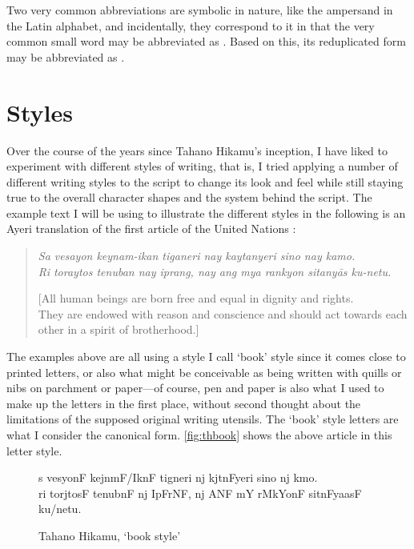 Two very common abbreviations are symbolic in nature, like the ampersand 
\orth{\&} in the Latin alphabet, and incidentally, they correspond to it in 
that the very common small word  may be abbreviated as 
\ayr{\&}. Based on this, its reduplicated form  may be abbreviated as \ayr{+}.


\section{Styles}

Over the course of the years since Tahano Hikamu's inception, I have liked to 
experiment with different styles of writing, that is, I tried applying a 
number of different writing styles to the script to change its look and feel 
while still staying true to the overall character shapes and the system behind 
the script. The example text I will be using to illustrate the different styles 
in the following is an Ayeri translation of the first article of the United 
Nations  \citep{benung:udhr}:

\blockcquote[Article 1]{udhr}{\textit{Sa vesayon keynam-ikan tiganeri nay
kaytanyeri sino nay kamo.\\
Ri toraytos tenuban nay iprang, nay ang mya rankyon sitanyās ku-netu.}

[All human beings are born free and equal in dignity and rights.\\
They are endowed with reason and conscience and should act towards each other 
in a spirit of brotherhood.]}

The examples above are all using a style I call `book' style since it 
comes close to printed letters, or also what might be conceivable as being 
written with quills or nibs on parchment or paper---of course, pen and paper is 
also what I used to make up the letters in the first place, without second 
thought about the limitations of the supposed original writing utensils. The 
`book' style letters are what I consider the canonical form. 
\autoref{fig:thbook} shows the above article in this letter style.

\begin{figure}[ht]\centering
\caption{Tahano Hikamu, `book style'}
{\Tagati\Large s vesyonF kejnmF/IknF tigneri nj kjtnFyeri sino nj kmo.\\
ri torjtosF tenubnF nj IpFrNF, nj ANF mY rMkYonF sitnFyaasF 
ku/netu.}
\label{fig:thbook}
\end{figure}


